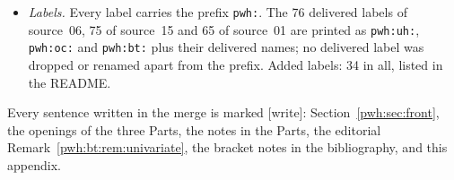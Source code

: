 \documentclass[11pt,letterpaper]{article}
\numberwithin{equation}{section}
\theoremstyle{definition}
\newcommand{\wtag}{\textup{[write]}}
\begin{document}
\begin{itemize}
(, , , ).
Notes in the validation sections map them to the shipped names; three
expanded-polynomial exports (two of source~06, one of source~15) are not
shipped because the shipped programs regenerate them exactly, and the
README gives the commands.
\item \emph{Labels.} Every label carries the prefix \texttt{pwh:}. The 76
delivered labels of source~06, 75 of source~15 and 65 of source~01 are
printed as \texttt{pwh:uh:}, \texttt{pwh:oc:} and \texttt{pwh:bt:} plus
their delivered names; no delivered label was dropped or renamed apart from
the prefix. Added labels: 34 in all, listed in the README.
\end{itemize}

Every sentence written in the merge is marked \wtag: Section~\ref{pwh:sec:front},
the openings of the three Parts, the notes in the Parts, the editorial
Remark~\ref{pwh:bt:rem:univariate}, the bracket notes in the
bibliography, and this appendix.
\end{document}
